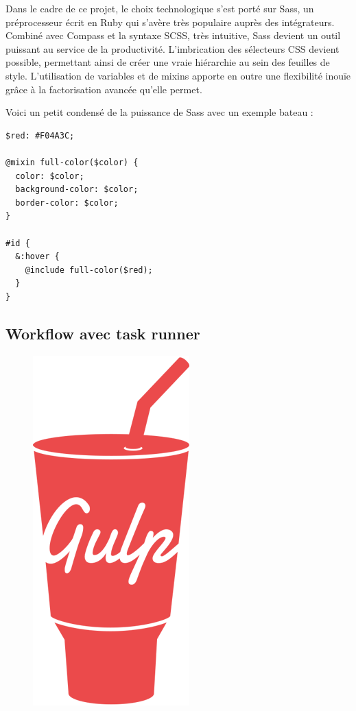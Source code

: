 \documentclass[a4paper,12pt]{article}
\begin{document}
Dans le cadre de ce projet, le choix technologique s'est porté sur Sass, un préprocesseur écrit en Ruby qui s'avère très populaire auprès des intégrateurs. Combiné avec Compass et la syntaxe SCSS, très intuitive, Sass devient un outil puissant au service de la productivité. L'imbrication des sélecteurs CSS devient possible, permettant ainsi de créer une vraie hiérarchie au sein des feuilles de style. L'utilisation de variables et de mixins apporte en outre une flexibilité inouïe grâce à la factorisation avancée qu'elle permet.

Voici un petit condensé de la puissance de Sass avec un exemple bateau :

\begin{lstlisting}
$red: #F04A3C;

@mixin full-color($color) {
  color: $color;
  background-color: $color;
  border-color: $color;
}

#id {  
  &:hover {
    @include full-color($red);
  }
}
\end{lstlisting}

\newpage

\subsection{Workflow avec task runner}

\begin{figure}[!h]
  \begin{center}
    \includegraphics[scale=0.2]{logo-gulp.png}
  \end{center}
\end{figure}
\end{document}
